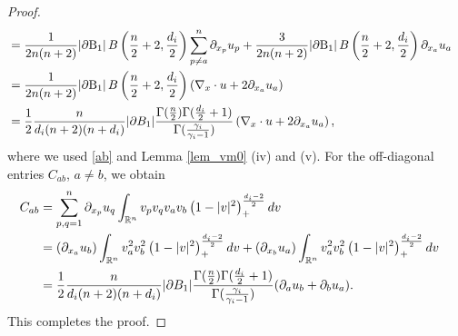 \documentclass[10pt,a4paper]{amsart}
\newcommand{\R}{\mathbb R}
\newcommand{\intr}{\int_{\R^n}}
\newcommand{\lt}{\left}
\newcommand{\pa}{\partial}
\newcommand{\rt}{\right}
\begin{document}
\begin{proof}
\begin{align*}
&=\frac{1}{2n(n+2)} |\partial \mathrm{B}_1| \, B\left(\frac{n}{2}+2, \frac{d_i}{2}\right) \sum_{p\neq a}^n\pa_{x_p}u_p + \frac{3}{2n(n+2)} |\partial \mathrm{B}_1| \, B\left(\frac{n}{2}+2, \frac{d_i}{2}\right)\pa_{x_a}u_a\cr 
&=\frac{1}{2n(n+2)} |\partial \mathrm{B}_1| \, B\left(\frac{n}{2}+2, \frac{d_i}{2}\right) \lt( \nabla_x \cdot u + 2 \pa_{x_a} u_a \rt)\cr 
&=\frac 12\frac{n}{d_i(n+2)(n+d_i)}|\pa {\rm B}_1|\frac{\Gamma(\frac n2)\Gamma(\frac {d_i}{2}+1)}{\Gamma(\frac{\gamma_i}{\gamma_i-1})} \lt( \nabla_x \cdot u + 2 \pa_{x_a} u_a \rt),
\end{align*}
where we used \eqref{ab} and Lemma \ref{lem_vm0} (iv) and (v). For the off-diagonal entries $C_{ab}$, $a \ne b$, we obtain
\begin{align*}
C_{ab}&=\sum_{p,q=1}^n\pa_{x_p}u_q\intr v_p v_q v_av_b \left(1-|v |^2\right)^{\frac{d_i-2}{2}}_+  dv\cr 
&=(\pa_{x_a}u_b)\intr v_a^2 v_b^2 \left(1-|v |^2\right)^{\frac{d_i-2}{2}}_+ dv+(\pa_{x_b}u_a)\intr v_a^2 v_b^2 \left(1-|v |^2\right)^{\frac{d_i-2}{2}}_+  dv\cr 
&=\frac 12\frac{n}{d_i(n+2)(n+d_i)}|\pa {\rm B}_1|\frac{\Gamma(\frac n2)\Gamma(\frac {d_i}{2}+1)}{\Gamma(\frac{\gamma_i}{\gamma_i-1})}(\pa_{a}u_b+\pa_b u_a ).
\end{align*}
This completes the proof.
\end{proof}
\end{document}

